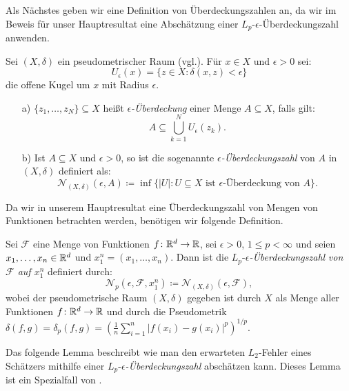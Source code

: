 Als Nächstes geben wir eine Definition von Überdeckungszahlen an, da wir im Beweis für unser Hauptresultat eine Abschätzung einer $L_p\text{-}\epsilon$-Überdeckungszahl anwenden.
\begin{defn}
\label{ueberdeckung}
Sei $(X, \delta)$ ein pseudometrischer Raum (vgl.\@ \cite[Definition~2.1.1]{Topologie2015}). Für $x \in X$ und $\epsilon > 0$ sei:
$$U_{\epsilon}(x) = \{z \in X : \delta(x, z) < \epsilon\}$$
die offene Kugel um $x$ mit Radius $\epsilon$.
\begin{itemize}
\item[a)] $\{z_1,\dots,z_N\} \subseteq X$ heißt $\epsilon$\textit{-Überdeckung} einer Menge $A \subseteq X$, falls gilt:
$$A \subseteq \bigcup_{k = 1}^N U_{\epsilon}(z_k).$$
\item[b)] Ist $A \subseteq X$ und $\epsilon > 0$, so ist die sogenannte $\epsilon$\textit{-Überdeckungszahl} von $A$ in $(X,\delta)$ definiert als:
$$\mathcal{N}_{(X,\delta)}(\epsilon, A) \coloneqq \inf\big\{|U| : U \subseteq X \text{ ist $\epsilon$-Überdeckung von } A\big\}.$$   
\end{itemize}
\end{defn}
Da wir in unserem Hauptresultat eine Überdeckungszahl von Mengen von Funktionen betrachten werden, benötigen wir folgende Definition.
\begin{defn}
\label{lpe}
Sei $\mathcal{F}$ eine Menge von Funktionen $f\colon \mathbb{R}^d \to \mathbb{R}$, sei $\epsilon > 0$, $1 \leq p < \infty$ und seien $x_1,\dots,x_n \in \mathbb{R}^d$ und $x_1^n = (x_1,\dots,x_n).$ Dann ist die $L_p$-$\epsilon$\textit{-Überdeckungszahl} \emph{von $\mathcal{F}$ auf $x_1^n$} definiert durch:
$$\mathcal{N}_p(\epsilon, \mathcal{F}, x_1^n) \coloneqq \mathcal{N}_{(X,\delta)}(\epsilon, \mathcal{F}),$$
wobei der pseudometrische Raum $(X, \delta)$ gegeben ist durch $X$ als Menge aller Funktionen $f\colon \mathbb{R}^d \to \mathbb{R}$ und durch die Pseudometrik $\delta(f, g) = \delta_p(f, g) = (\frac{1}{n}\sum_{i = 1}^n |f(x_i) - g(x_i)|^p)^{1/p}.$
\end{defn}
Das folgende Lemma beschreibt wie man den erwarteten $L_2$-Fehler eines Schätzers mithilfe einer $L_p$-$\epsilon$\textit{-Überdeckungszahl} abschätzen kann. Dieses Lemma ist ein Spezialfall von \cite[Lemma 8]{kohler19}.

